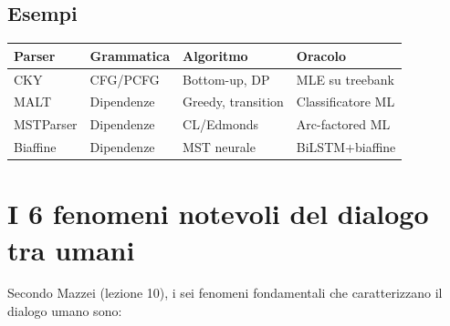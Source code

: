 \documentclass[12pt,a4paper]{article}
\begin{document}
\subsection{Esempi}

\begin{center}
\begin{tabular}{llll}
\toprule
\textbf{Parser} & \textbf{Grammatica} & \textbf{Algoritmo} & \textbf{Oracolo} \\
\midrule
CKY & CFG/PCFG & Bottom-up, DP & MLE su treebank \\
MALT & Dipendenze & Greedy, transition & Classificatore ML \\
MSTParser & Dipendenze & CL/Edmonds & Arc-factored ML \\
Biaffine & Dipendenze & MST neurale & BiLSTM+biaffine \\
\bottomrule
\end{tabular}
\end{center}

\section{I 6 fenomeni notevoli del dialogo tra umani}

Secondo Mazzei (lezione 10), i sei fenomeni fondamentali che caratterizzano il dialogo umano sono:
\end{document}
